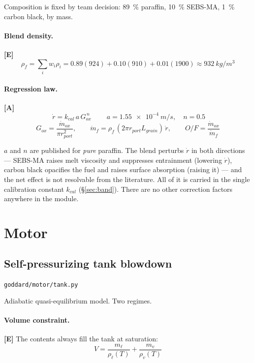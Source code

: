 \documentclass[11pt,a4paper]{article}
\newcommand{\established}{\textcolor{okgreen}{\textbf{[E]}}\xspace}
\newcommand{\approxi}{\textcolor{amber}{\textbf{[A]}}\xspace}
\newcommand{\src}[1]{\hfill{\footnotesize\texttt{#1}}}
\begin{document}
Composition is fixed by team decision: \SI{89}{\percent} paraffin,
\SI{10}{\percent} SEBS-MA, \SI{1}{\percent} carbon black, by mass.

\paragraph{Blend density.} \established
\begin{equation}
\rho_f = \sum_i w_i \rho_i
       = 0.89(924) + 0.10(910) + 0.01(1900)
       \approx \SI{932}{kg/m^3}
\end{equation}

\paragraph{Regression law.} \approxi
\begin{equation}
\boxed{\ \dot r = k_{cal}\, a\, G_{ox}^{\,n}\ }
\qquad a = \SI{1.55e-4}{m/s},\quad n = 0.5
\label{eq:regression}
\end{equation}
\begin{equation}
G_{ox} = \frac{\dot m_{ox}}{\pi r_{port}^2}, \qquad
\dot m_f = \rho_f \, (2\pi r_{port} L_{grain})\, \dot r, \qquad
O\!/\!F = \frac{\dot m_{ox}}{\dot m_f}
\end{equation}

$a$ and $n$ are published for \emph{pure} paraffin. The blend perturbs $\dot r$
in both directions --- SEBS-MA raises melt viscosity and suppresses
entrainment (lowering $\dot r$), carbon black opacifies the fuel and raises
surface absorption (raising it) --- and the net effect is not resolvable from
the literature. All of it is carried in the single calibration constant
$k_{cal}$ (\S\ref{sec:band}). There are no other correction factors anywhere in
the module.

\section{Motor}

\subsection{Self-pressurizing tank blowdown}
\label{sec:tank}
\src{goddard/motor/tank.py}

Adiabatic quasi-equilibrium model. Two regimes.

\paragraph{Volume constraint.} \established
The contents always fill the tank at saturation:
\begin{equation}
V = \frac{m_\ell}{\rho_\ell(T)} + \frac{m_v}{\rho_v(T)}
\label{eq:tankvol}
\end{equation}
\end{document}

